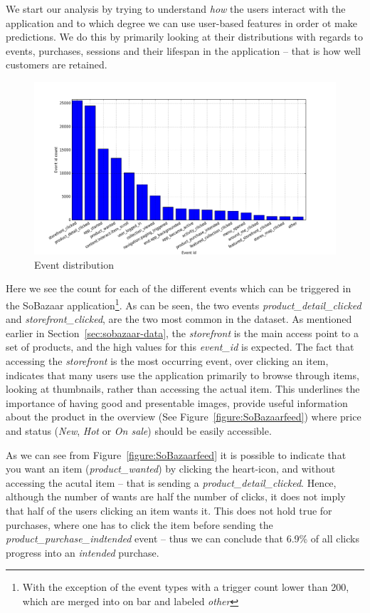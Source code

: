 We start our analysis by trying to understand \textit{how} the users interact
with the application and to which degree we can use user-based features in
order ot make predictions. We do this by primarily looking at their
distributions with regards to events, purchases, sessions and their lifespan in
the application -- that is how well customers are retained.

\begin{figure}[H]
  \includegraphics[width=5in]{image/event_iddistribution.png}
  \centering
  \caption{Event distribution}
\label{figure:eventIDDistribution}
\end{figure}

Here we see the count for each of the different events which can be triggered
in the SoBazaar application\footnote{With the exception of the event types with
a trigger count lower than 200, which are merged into on bar and labeled
\emph{other}}. As can be seen, the two events \emph{product\_detail\_clicked}
and \emph{storefront\_clicked}, are the two most common in the dataset.
As mentioned earlier in Section~\ref{sec:sobazaar-data}, the \emph{storefront}
is the main access point to a set of products, and the high values for this
\emph{event\_id} is expected. The fact that accessing the \emph{storefront} is
the most occurring event, over clicking an item, indicates that many users use
the application primarily to browse through items, looking at thumbnails,
rather than accessing the actual item. This underlines the importance of having
good and presentable images, provide useful information about the product in
the overview (See Figure~\ref{figure:SoBazaarfeed}) where price and status
(\textit{New}, \textit{Hot} or \textit{On sale}) should be easily accessible.

As we can see from Figure~\ref{figure:SoBazaarfeed} it is possible to indicate
that you want an item (\textit{product\_wanted}) by clicking the heart-icon,
and without accessing the acutal item -- that is sending a
\textit{product\_detail\_clicked}. Hence, although the number of wants are half
the number of clicks, it does not imply that half of the users clicking an item
wants it. This does not hold true for purchases, where one has to click the
item before sending the \textit{product\_purchase\_indtended} event -- thus we
can conclude that 6.9\% of all clicks progress into an \textit{intended}
purchase.

